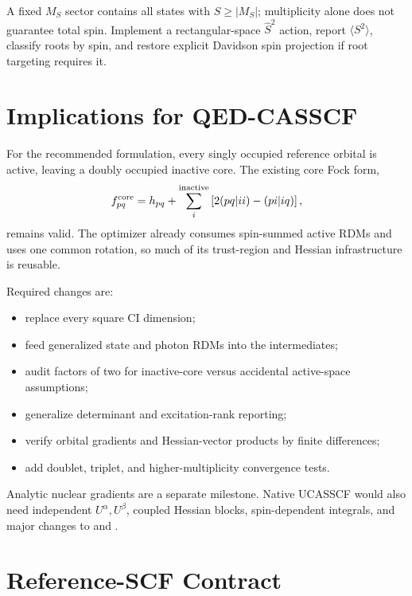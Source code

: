 \documentclass[11pt]{article}
\begin{document}
A fixed \(M_S\) sector contains all states with \(S\ge |M_S|\); multiplicity
alone does not guarantee total spin. Implement a rectangular-space
\(\hat S^2\) action, report \(\langle S^2\rangle\), classify roots by spin,
and restore explicit Davidson spin projection if root targeting requires it.

\section{Implications for QED-CASSCF}

For the recommended formulation, every singly occupied reference orbital is
active, leaving a doubly occupied inactive core. The existing core Fock form,
\[
f^{\rm core}_{pq}=h_{pq}+\sum_i^{\rm inactive}
\left[2(pq|ii)-(pi|iq)\right],
\]
remains valid. The optimizer already consumes spin-summed active RDMs and uses
one common rotation, so much of its trust-region and Hessian infrastructure is
reusable.

Required changes are:
\begin{itemize}
  \item replace every square CI dimension;
  \item feed generalized state and photon RDMs into the intermediates;
  \item audit factors of two for inactive-core versus accidental active-space
  assumptions;
  \item generalize determinant and excitation-rank reporting;
  \item verify orbital gradients and Hessian-vector products by finite
  differences;
  \item add doublet, triplet, and higher-multiplicity convergence tests.
\end{itemize}

Analytic nuclear gradients are a separate milestone. Native UCASSCF would also
need independent \(U^\alpha,U^\beta\), coupled Hessian blocks, spin-dependent
integrals, and major changes to  and
.

\section{Reference-SCF Contract}
\end{document}
